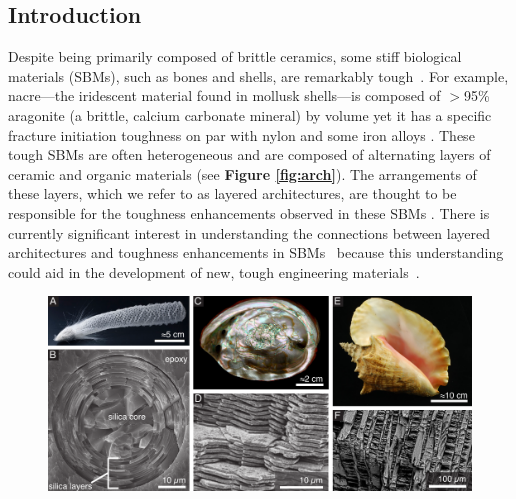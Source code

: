 \documentclass[12pt,onecolumn]{article}
\begin{document}
\linenumbers
\begin{bibunit}
\section{Introduction}
Despite being primarily composed of brittle ceramics, some stiff biological materials (SBMs), such as bones and shells, are remarkably tough~\cite{ritchie2011conflicts, wegst2015bioinspired, wang2001, gao2017mass}. For example, nacre---the iridescent material found in mollusk shells---is composed of $>$95\% aragonite (a brittle, calcium carbonate mineral) by volume yet it has a specific fracture initiation toughness on par with nylon and some iron alloys \cite{gao2017mass}. These tough SBMs are often heterogeneous and are composed of alternating layers of ceramic and organic materials (see {\bf Figure \ref{fig:arch}}). The arrangements of these layers, which we refer to as layered architectures, are thought to be responsible for the toughness enhancements observed in these SBMs \cite{mayer2011new}. There is currently significant interest in understanding the connections between layered architectures and toughness enhancements in SBMs~\cite{mayer2011new,mayer2005rigid,rabiei2010failure, kolednik2011bioinspired} because this understanding could aid in the development of new, tough engineering materials~\cite{munch2008tough,karambelas2013strombus,gao2017mass}.
%
			\begin{figure}[ht!]
			\centering
			\includegraphics[width=\textwidth]{../Figures/FigureArchEx/Figure1_V3.pdf}

\end{figure}
\end{bibunit}
\end{document}
